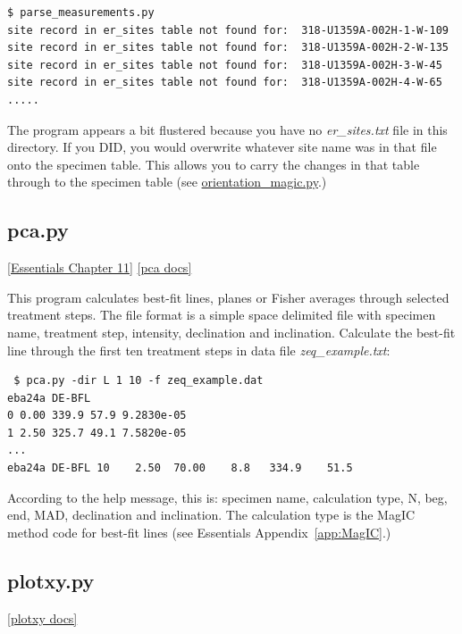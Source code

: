 \documentclass[11pt]{book}
\begin{document}
{{{{\begin{verbatim}
$ parse_measurements.py
site record in er_sites table not found for:  318-U1359A-002H-1-W-109
site record in er_sites table not found for:  318-U1359A-002H-2-W-135
site record in er_sites table not found for:  318-U1359A-002H-3-W-45
site record in er_sites table not found for:  318-U1359A-002H-4-W-65
.....
\end{verbatim}

The program appears a bit flustered because you have no {\it er\_sites.txt} file in this directory.  If you DID, you would overwrite whatever site name was in that file onto the specimen table.  This allows you to carry the changes in that table through to the specimen table (see \href{#orientation_magic.py}{orientation\_magic.py}.)


%
\subsection{pca.py}
\href{http://earthref.org/MAGIC/books/Tauxe/Essentials/WebBook3ch11.html#ch11}{[Essentials Chapter 11]}
\href{https://github.com/PmagPy/PmagPy/blob/master/programs/pca.py}{[pca docs]}

This program calculates best-fit lines, planes or Fisher averages through selected treatment steps.  The file format is
a simple space delimited file with specimen name, treatment step,  intensity, declination and inclination.  Calculate the best-fit
line through the first ten treatment steps in data file {\it zeq\_example.txt}:

 \begin{verbatim}
 $ pca.py -dir L 1 10 -f zeq_example.dat
eba24a DE-BFL
0 0.00 339.9 57.9 9.2830e-05
1 2.50 325.7 49.1 7.5820e-05
...
eba24a DE-BFL 10    2.50  70.00    8.8   334.9    51.5
\end{verbatim}

 According to the help message, this is: specimen name, calculation type, N, beg, end, MAD, declination and inclination.   The calculation type is the MagIC method code for best-fit lines (see Essentials Appendix~\ref{app:MagIC}.)


%
%


  \subsection{plotxy.py}
  \href{https://github.com/PmagPy/PmagPy/blob/master/programs/plotxy.py}{[plotxy docs]}

}}}}
\end{document}
